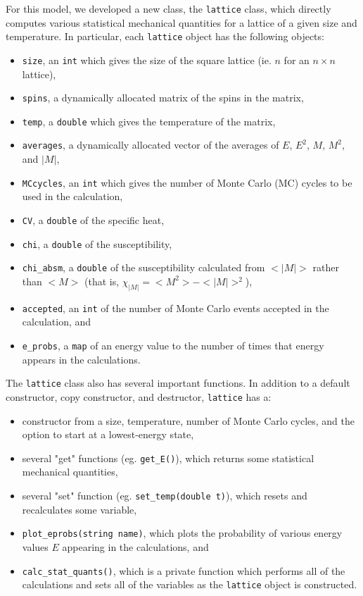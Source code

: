 \documentclass[12pt]{article}
\numberwithin{equation}{section}
\begin{document}
For this model, we developed a new class, the \texttt{lattice} class, which directly computes various statistical mechanical quantities for a lattice of a given size and temperature.  In particular, each \texttt{lattice} object has the following objects:
\begin{itemize}
\item \texttt{size}, an \texttt{int} which gives the size of the square lattice (ie. $n$ for an $n\times n$ lattice),
\item \texttt{spins}, a dynamically allocated matrix of the spins in the matrix,
\item \texttt{temp}, a \texttt{double} which gives the temperature of the matrix,
\item \texttt{averages}, a dynamically allocated vector of the averages of $E$, $E^{2}$, $M$, $M^{2}$, and $|M|$,
\item \texttt{MCcycles}, an \texttt{int} which gives the number of Monte Carlo (MC) cycles to be used in the calculation,
\item \texttt{CV}, a \texttt{double} of the specific heat,
\item \texttt{chi}, a \texttt{double} of the susceptibility,
\item \texttt{chi\_absm}, a \texttt{double} of the susceptibility calculated from $<|M|>$ rather than $<M>$ (that is, $\chi_{|M|}=<M^{2}>-<|M|>^{2}$),
\item \texttt{accepted}, an \texttt{int} of the number of Monte Carlo events accepted in the calculation, and
\item \texttt{e\_probs}, a \texttt{map} of an energy value to the number of times that energy appears in the calculations.
\end{itemize}
\par The \texttt{lattice} class also has several important functions.  In addition to a default constructor, copy constructor, and  destructor, \texttt{lattice} has a:
\begin{itemize}
\item constructor from a size, temperature, number of Monte Carlo cycles, and the option to start at a lowest-energy state,
\item several "get" functions (eg. \texttt{get\_{E}()}), which returns some statistical mechanical quantities,
\item several "set" function (eg. \texttt{set\_temp(double t)}), which resets and recalculates some variable,
\item \texttt{plot\_eprobs(string name)}, which plots the probability of various energy values $E$ appearing in the calculations, and
\item \texttt{calc\_stat\_quants()}, which is a private function which performs all of the calculations and sets all of the variables as the \texttt{lattice} object is constructed.
\end{itemize} 
\end{document}
